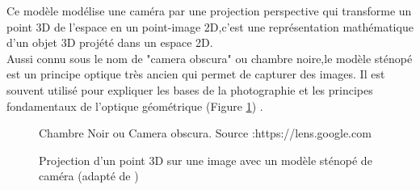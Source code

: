   Ce modèle modélise une caméra par une projection perspective qui transforme un point 3D de l'espace en un point-image 2D,c'est une représentation mathématique d'un objet 3D projété dans un espace 2D\cite{orteu_calibrage_nodate}.\\
  Aussi connu sous le nom de "camera obscura" ou chambre noire,le modèle sténopé est un principe optique très ancien qui permet de capturer des images. Il est souvent utilisé pour expliquer les bases de la photographie et les principes fondamentaux de l'optique géométrique (Figure \ref{fig:Chambre Noir}) . 
 
  \begin{figure}[H]%
  	\center%
  	\setlength{\fboxsep}{5pt}%
  	\setlength{\fboxrule}{0.5pt}%
  		\caption[Chambre Noir]{Chambre Noir ou Camera obscura. Source :https://lens.google.com}
  	\label{fig:Chambre Noir}
  \end{figure}
  
   \begin{figure}[H]%
  	\center%
  	\setlength{\fboxsep}{5pt}%
  	\setlength{\fboxrule}{0.5pt}%
  	\caption[Représentation du modèl sténopé]{Projection d’un point 3D sur une image avec un modèle sténopé de caméra (adapté de \cite{eikosim_etalonnage_2021})}
    \label{fig:Représentation du modèl sténopé}
  \end{figure}
  
